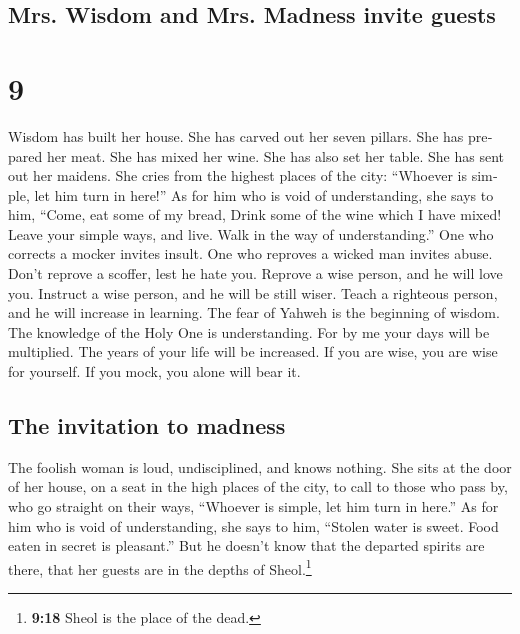 \begin{paracol}{2}
\switchcolumn
\begin{otherlanguage}{english}

\hypertarget{mrs.-wisdom-and-mrs.-madness-invite-guests}{%
\subsection{Mrs. Wisdom and Mrs. Madness invite
guests}\label{mrs.-wisdom-and-mrs.-madness-invite-guests}}

\hypertarget{section-17}{%
\section{9}\label{section-17}}

 Wisdom has built her house. She has carved out her seven
pillars.  She has prepared her meat. She has mixed her
wine. She has also set her table.  She has sent out her
maidens. She cries from the highest places of the city: 
``Whoever is simple, let him turn in here!'' As for him who is void of
understanding, she says to him,  ``Come, eat some of my
bread, Drink some of the wine which I have mixed!  Leave
your simple ways, and live. Walk in the way of understanding.''
 One who corrects a mocker invites insult. One who
reproves a wicked man invites abuse.  Don't reprove a
scoffer, lest he hate you. Reprove a wise person, and he will love you.
 Instruct a wise person, and he will be still wiser. Teach
a righteous person, and he will increase in learning. 
The fear of Yahweh is the beginning of wisdom. The knowledge of the Holy
One is understanding.  For by me your days will be
multiplied. The years of your life will be increased.  If
you are wise, you are wise for yourself. If you mock, you alone will
bear it.

\hypertarget{the-invitation-to-madness}{%
\subsection{The invitation to madness}\label{the-invitation-to-madness}}

 The foolish woman is loud, undisciplined, and knows
nothing.  She sits at the door of her house, on a seat in
the high places of the city,  to call to those who pass
by, who go straight on their ways,  ``Whoever is simple,
let him turn in here.'' As for him who is void of understanding, she
says to him,  ``Stolen water is sweet. Food eaten in
secret is pleasant.''  But he doesn't know that the
departed spirits are there, that her guests are in the depths of
Sheol.\footnote{\textbf{9:18} Sheol is the place of the dead.}


\end{otherlanguage}
\end{paracol}
